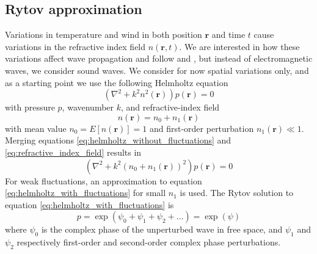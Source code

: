 \subsection{Rytov approximation}
Variations in temperature and wind in both position $\mathbf{r}$ and time $t$ cause variations in the refractive index field $n(\mathbf{r},t)$.
We are interested in how these variations affect wave propagation and follow \cite{Ishimaru1997} and \cite{Jurado-navas2006}, but instead of electromagnetic waves, we consider sound waves.
We consider for now spatial variations only, and as a starting point we use the following Helmholtz equation %
\begin{equation}\label{eq:helmholtz_without_fluctuations}
 \left( \nabla^2 + k^2 n^2(\mathbf{r}) \right) p(\mathbf{r})= 0
\end{equation}
with pressure $p$, wavenumber $k$, and refractive-index field
\begin{equation}\label{eq:refractive_index_field}
 n(\mathbf{r}) = n_0 + n_1(\mathbf{r})
\end{equation}
with mean value $n_0 = E[n(\mathbf{r})] = 1$ and first-order perturbation $n_1(\mathbf{r}) \ll 1$. Merging equations \eqref{eq:helmholtz_without_fluctuations} and \eqref{eq:refractive_index_field} results in
\begin{equation}\label{eq:helmholtz_with_fluctuations}
 \left( \nabla^2 + k^2 (n_0 + n_1(\mathbf{r}))^2 \right) p(\mathbf{r}) = 0
\end{equation}
For weak fluctuations, an approximation to equation \eqref{eq:helmholtz_with_fluctuations} for small $n_1$ is used.
The Rytov solution to equation \eqref{eq:helmholtz_with_fluctuations} is
\begin{equation}
 p = \exp{\left(\psi_0 + \psi_1 + \psi_2 + \dots \right)} = \exp{(\psi)}
\end{equation}
where $\psi_0$ is the complex phase of the unperturbed wave in free space, and $\psi_1$ and $\psi_2$ respectively first-order and second-order complex phase perturbations.

